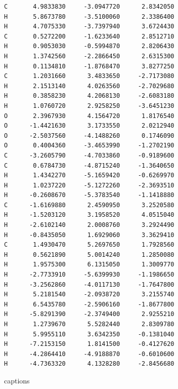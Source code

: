\documentclass[
digital, %
table,   %
lof,     %
lot,     %
oneside,
]{fithesis3}
\begin{document}
\begin{lstlisting}[frame=single, caption={puvodni struktura C trans },label=DescriptiveLabel]
C       4.9833830     -3.0947720      2.8342050
H       5.8673780     -3.5100060      2.3386400
H       4.7075330     -3.7397940      3.6724430
C       0.5272200     -1.6233640      2.8512710
H       0.9053030     -0.5994870      2.8206430
H       1.3742560     -2.2866450      2.6315300
H       0.1134810     -1.8768470      3.8277250
C       1.2031660      3.4833650     -2.7173080
H       2.1513140      4.0263560     -2.7029680
H       0.3858230      4.2068130     -2.6083180
H       1.0760720      2.9258250     -3.6451230
O       2.3967930      4.1564720      1.8176540
O      -1.4421630      3.1733550      2.0212940
O      -2.5037560     -4.1488260      0.1746090
O       0.4004360     -3.4653990     -1.2702190
C      -3.2605790     -4.7033860     -0.9189600
C       0.6784730     -4.8715240     -1.3640650
H       1.4342270     -5.1659420     -0.6269970
H       1.0237220     -5.1272260     -2.3693510
H      -0.2608670     -5.3783540     -1.1418880
C      -1.6169880      2.4590950      3.2520580
H      -1.5203120      3.1958520      4.0515040
H      -2.6102140      2.0008760      3.2924490
H      -0.8435050      1.6929060      3.3629410
C       1.4930470      5.2697650      1.7928560
H       0.5621890      5.0014240      1.2850080
H       1.9575300      6.1315050      1.3009770
H      -2.7733910     -5.6399930     -1.1986650
H      -3.2562860     -4.0117130     -1.7647800
H       5.2181540     -2.0938720      3.2155740
H       6.5435780     -2.5906160     -1.8677800
H      -5.8291390     -2.3749400      2.9255210
H       1.2739670      5.5282440      2.8309780
H       5.9955110      3.6342350     -0.1381040
H      -7.2153150      1.8141500     -0.4127620
H      -4.2864410     -4.9188870     -0.6010600
H      -4.7363320      4.1328280     -2.8456680

\end{lstlisting}


{\csname captions\languagename\endcsname %
\makeatletter %
\thesis@selectLocale{\thesis@locale}\makeatother
\printbibliography[heading=bibintoc]} %
\appendix %
\end{document}
